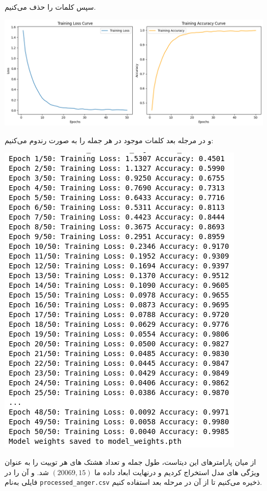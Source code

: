 \begin{qsolve}
	سپس کلمات  را حذف می‌کنیم.
\end{qsolve}



\begin{qsolve}
	\begin{center}
		\includegraphics*[width=0.7\linewidth]{pics/img4.png}
		\label{حذف کلمات ایست}
	\end{center}
	
	و در مرجله بعد کلمات موجود در هر جمله را به صورت رندوم  می‌کنیم:
	
	\begin{center}
		\includegraphics*[width=0.7\linewidth]{pics/img5.png}
		\label{کلمات بهم ریخته در جمله}
	\end{center}
	
	از میان پارامترهای این دیتاست، طول جمله و تعداد هشتک های هر توییت را به عنوان ویژگی های مدل استخراج کردیم و درنهایت ابعاد داده ما $(20069, 15)$ شد. و آن را در فایلی به‌نام \texttt{processed\_anger.csv} ذخیره می‌کنیم تا از آن در مرحله بعد استفاده کنیم.
	

\end{qsolve}
